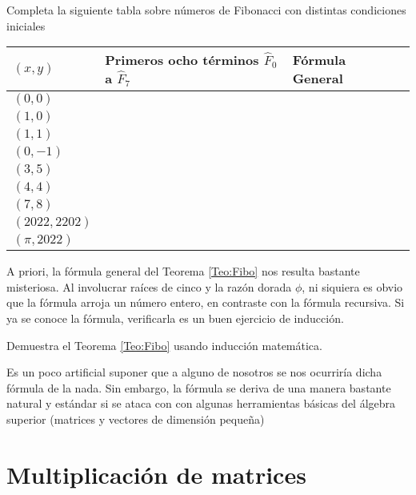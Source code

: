 \begin{ejercicio} Completa la siguiente tabla sobre números de Fibonacci con distintas condiciones iniciales

  \begin{center}
    \renewcommand{\arraystretch}{1.5}
    \begin{tabular}{llll}
      \hline
      $(x,y)$ & Primeros ocho términos $\hat F_0$ a $\hat F_7$ & Fórmula General \\
      \hline
      $(0,0)$ &  &  \\
      \hline
      $(1,0)$ &  &  \\
            \hline
      $(1,1)$ &  &  \\
            \hline
      $(0,-1)$ &  &  \\
            \hline
      $(3,5)$ &  &  \\
            \hline
      $(4,4)$ &  &  \\
            \hline
      $(7,8)$ &  &  \\
                  \hline
      $(2022,2202)$ &  &  \\
                  \hline
      $(\pi,2022)$ &  &  \\
                  \hline
    \end{tabular}
  \end{center}
\end{ejercicio}

A priori, la fórmula general del Teorema \ref{Teo:Fibo} nos resulta bastante misteriosa. Al involucrar raíces de cinco y la razón dorada $\phi$, ni siquiera es obvio que la fórmula arroja un número entero, en contraste con la fórmula recursiva. Si ya se conoce la fórmula, verificarla es un buen ejercicio de inducción.

\begin{ejercicio}
Demuestra el Teorema \ref{Teo:Fibo} usando inducción matemática.
\end{ejercicio}

Es un poco artificial suponer que a alguno de nosotros se nos ocurriría dicha fórmula de la nada. Sin embargo, la fórmula se deriva de una manera bastante natural y estándar si se ataca con con algunas herramientas básicas del álgebra superior (matrices y vectores de dimensión pequeña) 

\section{Multiplicación de matrices}

